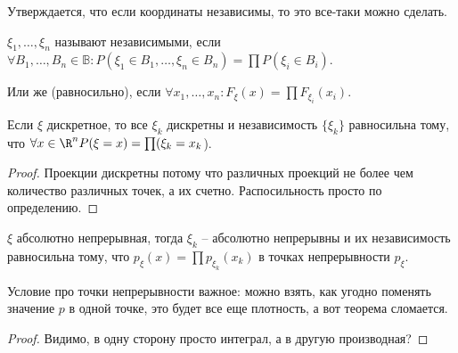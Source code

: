 \begin{minipage}[c]{0.3\textwidth}
\end{minipage}
\begin{minipage}[c]{0.3\textwidth}
\end{minipage}
\begin{minipage}[c]{0.3\textwidth}
\end{minipage}

Утверждается, что если координаты независимы, то это все-таки можно сделать.
\begin{Def}
$\xi_1, \dots, \xi_n$ называют независимыми, если $\forall B_1, \dots, B_n \in \mathbb{B}\colon P(\xi_1 \in B_1, \dots, \xi_n \in B_n) = \prod P(\xi_i \in B_i)$.

Или же (равносильно), если $\forall x_1, \dots, x_n\colon F_{\xi}(x) = \prod F_{\xi_i}(x_i)$.
\end{Def}
\begin{theorem}
Если $\xi$ дискретное, то все $\xi_k$ дискретны и независимость $\{\xi_k\}$ равносильна тому, что $\forall x \in \R^n P(\xi=x) = \prod (\xi_k = x_k$).
\end{theorem}
\begin{proof}
Проекции дискретны потому что различных проекций не более чем количество различных точек, а их счетно. 
Распосильность просто по определению.
\end{proof}
\begin{theorem}
$\xi$ абсолютно непрерывная, тогда $\xi_k$ -- абсолютно непрерывны и их независимость равносильна тому, что $p_{\xi}(x) = \prod p_{\xi_k}(x_k)$ в точках непрерывности $p_{\xi}$.
\end{theorem}
\begin{Rem}
Условие про точки непрерывности важное: можно взять, как угодно поменять значение $p$ в одной точке, это будет все еще плотность, а вот теорема сломается.
\end{Rem}
\begin{proof}
Видимо, в одну сторону просто интеграл, а в другую производная? \TODO
\end{proof}

